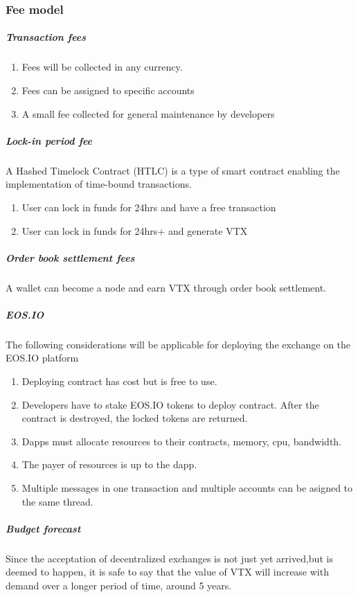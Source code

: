 \documentclass[]{article}
\begin{document}
\subsubsection{Fee model}
\subparagraph{Transaction fees\\}
\begin{enumerate}
	\item Fees will be collected in any currency.\\
	\item Fees can be assigned to specific accounts\\
	\item A small fee collected for general maintenance by developers\\
\end{enumerate}
\subparagraph{Lock-in period fee\\}
	A Hashed Timelock Contract (HTLC)\cite{22} is a type of smart contract enabling the implementation of time-bound transactions.
\begin{enumerate}
	\item User can lock in funds for 24hrs and have a free transaction\\
	\item User can lock in funds for 24hrs+ and generate VTX \\
\end{enumerate}
\subparagraph{Order book settlement fees}
A wallet can become a node and earn VTX through order book settlement. 


\subparagraph{EOS.IO}
The following considerations will be applicable for deploying the exchange on the EOS.IO platform
\begin{enumerate}
\item Deploying contract has cost but is free to use. 
\item Developers have to stake EOS.IO tokens to deploy contract.
After the contract is destroyed, the locked tokens are returned.
\item Dapps must allocate resources to their contracts, memory, cpu, bandwidth. 
\item The payer of resources is up to the dapp.
\item Multiple messages in one transaction and multiple accounts can be asigned to the same thread.

\end{enumerate}

\subparagraph{Budget forecast}
Since the acceptation of decentralized exchanges is not just yet arrived,but is deemed to happen, it is safe to say that the value of VTX will increase with demand over a longer period of time, around 5 years.
\end{document}
